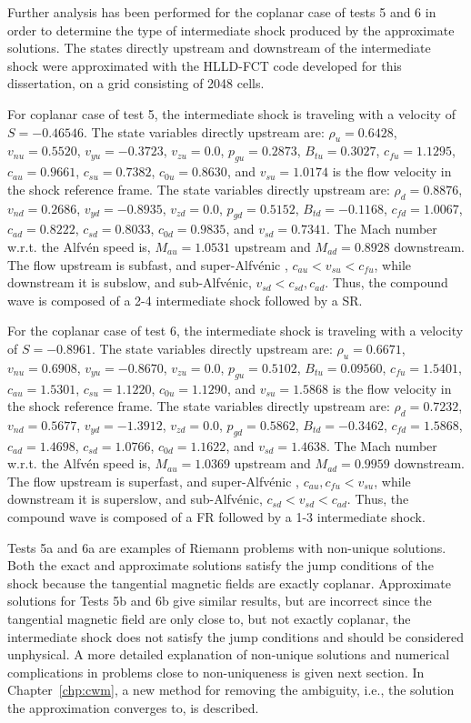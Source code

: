 Further analysis has been performed for the coplanar case of tests 5 and 6 in order to determine the type of intermediate shock produced by the approximate solutions.  The states directly upstream and downstream of the intermediate shock were approximated with the HLLD-FCT code developed for this dissertation, on a grid consisting of 2048 cells.

For coplanar case of test 5, the intermediate shock is traveling with a velocity of $S=-0.46546$.  The state variables directly upstream are: $\rho_u = 0.6428$, $v_{nu} = 0.5520$, $v_{yu} = -0.3723$, $v_{zu} = 0.0$, $p_{gu} = 0.2873$, $B_{tu} = 0.3027$, $c_{fu} = 1.1295$, $c_{au} = 0.9661$, $c_{su} = 0.7382$, $c_{0u} = 0.8630$, and $v_{su} = 1.0174$ is the flow velocity in the shock reference frame.  The state variables directly upstream are: $\rho_d = 0.8876$, $v_{nd} = 0.2686$, $v_{yd} = -0.8935$, $v_{zd} = 0.0$, $p_{gd} = 0.5152$, $B_{td} = -0.1168$, $c_{fd} = 1.0067$, $c_{ad} = 0.8222$, $c_{sd} = 0.8033$, $c_{0d} = 0.9835$, and $v_{sd} = 0.7341$.  The Mach number w.r.t. the Alfv{\'e}n speed is, $M_{au} = 1.0531$ upstream and $M_{ad} = 0.8928$ downstream.  The flow upstream is subfast, and super-Alfv{\'e}nic , $ c_{au} < v_{su} <c_{fu}$, while downstream it is subslow, and sub-Alfv{\'e}nic, $v_{sd} < c_{sd},c_{ad}$.  Thus, the compound wave is composed of a 2-4 intermediate shock followed by a SR.        

For the coplanar case of test 6, the intermediate shock is traveling with a velocity of $S=-0.8961$.  The state variables directly upstream are: $\rho_u = 0.6671$, $v_{nu} = 0.6908$, $v_{yu} = -0.8670$, $v_{zu} = 0.0$, $p_{gu} = 0.5102$, $B_{tu} = 0.09560$, $c_{fu} = 1.5401$, $c_{au} = 1.5301$, $c_{su} = 1.1220$, $c_{0u} = 1.1290$, and $v_{su} = 1.5868$ is the flow velocity in the shock reference frame.  The state variables directly upstream are: $\rho_d = 0.7232$, $v_{nd} = 0.5677$, $v_{yd} = -1.3912$, $v_{zd} = 0.0$, $p_{gd} = 0.5862$, $B_{td} = -0.3462$, $c_{fd} = 1.5868$, $c_{ad} = 1.4698$, $c_{sd} = 1.0766$, $c_{0d} = 1.1622$, and $v_{sd} = 1.4638$.  The Mach number w.r.t. the Alfv{\'e}n speed is, $M_{au} = 1.0369$ upstream and $M_{ad} = 0.9959$ downstream.  The flow upstream is superfast, and super-Alfv{\'e}nic , $ c_{au}, c_{fu} < v_{su}$, while downstream it is superslow, and sub-Alfv{\'e}nic, $c_{sd} < v_{sd} < c_{ad}$.  Thus, the compound wave is composed of a FR followed by a 1-3 intermediate shock.        

Tests 5a and 6a are examples of Riemann problems with non-unique solutions.  Both the exact and approximate solutions satisfy the jump conditions of the shock because the tangential magnetic fields are exactly coplanar.  Approximate solutions for Tests 5b and 6b give similar results, but are incorrect since the tangential magnetic field are only close to, but not exactly coplanar, the intermediate shock does not satisfy the jump conditions and should be considered unphysical.  A more detailed explanation of non-unique solutions and numerical complications in problems close to non-uniqueness is given next section.  In Chapter~\ref{chp:cwm}, a new method for removing the ambiguity, i.e., the solution the approximation converges to, is described. 

